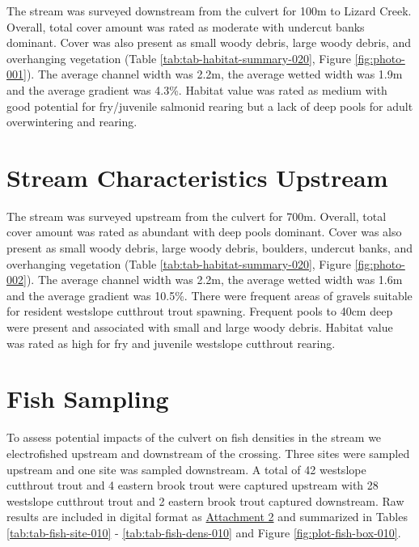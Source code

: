 \documentclass[
]{book}
\begin{document}
The stream was surveyed downstream from the culvert for 100m to Lizard Creek. Overall, total cover amount was rated as moderate with undercut banks dominant. Cover was also present as small woody debris, large woody debris, and overhanging vegetation (Table \ref{tab:tab-habitat-summary-020}, Figure \ref{fig:photo-001}). The average channel width was 2.2m, the average wetted width was 1.9m and the average gradient was 4.3\%. Habitat value was rated as medium with good potential for fry/juvenile salmonid rearing but a lack of deep pools for adult overwintering and rearing.

\hypertarget{stream-characteristics-upstream}{%
\section*{Stream Characteristics Upstream}\label{stream-characteristics-upstream}}

The stream was surveyed upstream from the culvert for 700m. Overall, total cover amount was rated as abundant with deep pools dominant. Cover was also present as small woody debris, large woody debris, boulders, undercut banks, and overhanging vegetation (Table \ref{tab:tab-habitat-summary-020}, Figure \ref{fig:photo-002}). The average channel width was 2.2m, the average wetted width was 1.6m and the average gradient was 10.5\%. There were frequent areas of gravels suitable for resident westslope cutthrout trout spawning. Frequent pools to 40cm deep were present and associated with small and large woody debris. Habitat value was rated as high for fry and juvenile westslope cutthrout rearing.

\hypertarget{fish-sampling}{%
\section*{Fish Sampling}\label{fish-sampling}}

To assess potential impacts of the culvert on fish densities in the stream we electrofished upstream and downstream of the crossing. Three sites were sampled upstream and one site was sampled downstream. A total of 42 westslope cutthrout trout and 4 eastern brook trout were captured upstream with 28 westslope cutthrout trout and 2 eastern brook trout captured downstream. Raw results are included in digital format as \href{https://github.com/NewGraphEnvironment/fish_passage_elk_2020_reporting/raw/master/data/habitat_confirmations.xls}{Attachment 2} and summarized in Tables \ref{tab:tab-fish-site-010} - \ref{tab:tab-fish-dens-010} and Figure \ref{fig:plot-fish-box-010}.
\end{document}

